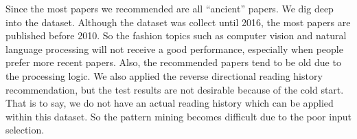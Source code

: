 Since the most papers we recommended are all ``ancient'' papers. We dig deep into the dataset. Although the dataset was collect until 2016, the most papers are published before 2010. So the fashion topics such as computer vision and natural language processing will not receive a good performance, especially when people prefer more recent papers. Also, the recommended papers tend to be old due to the processing logic. We also applied the reverse directional reading history recommendation, but the test results are not desirable because of the cold start. That is to say, we do not have an actual reading history which can be applied within this dataset. So the pattern mining becomes difficult due to the poor input selection.

